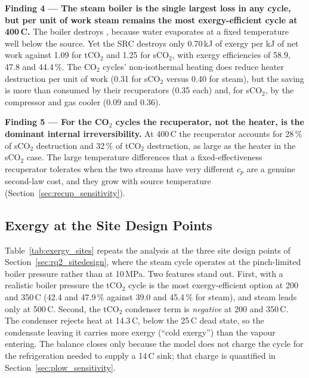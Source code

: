 \begin{findingbox}
\textbf{Finding 4 --- The steam boiler is the single largest loss in any
cycle, but per unit of work steam remains the most exergy-efficient cycle
at 400\,\textdegree C.}
The boiler destroys ,
because water evaporates at a fixed temperature well below the source. Yet
the SRC destroys only 0.70\,kJ of exergy per kJ of net work against 1.09 for
tCO$_2$ and 1.25 for sCO$_2$, with exergy efficiencies of 58.9, 47.8 and
44.4\,\%. The CO$_2$ cycles' non-isothermal heating does reduce heater
destruction per unit of work (0.31 for sCO$_2$ versus 0.40 for steam), but
the saving is more than consumed by their recuperators (0.35 each) and, for
sCO$_2$, by the compressor and gas cooler (0.09 and 0.36).
\end{findingbox}

\begin{findingbox}
\textbf{Finding 5 --- For the CO$_2$ cycles the recuperator, not the heater,
is the dominant internal irreversibility.}
At 400\,\textdegree C the recuperator accounts for 28\,\% of sCO$_2$
destruction and 32\,\% of tCO$_2$ destruction, as large as the heater in the
sCO$_2$ case. The large temperature differences that a fixed-effectiveness
recuperator tolerates when the two streams have very different $c_p$ are a
genuine second-law cost, and they grow with source temperature
(Section~\ref{sec:recup_sensitivity}).
\end{findingbox}

\subsection{Exergy at the Site Design Points}

Table~\ref{tab:exergy_sites} repeats the analysis at the three site design
points of Section~\ref{sec:rq2_sitedesign}, where the steam cycle operates at
the pinch-limited boiler pressure rather than at 10\,MPa. Two features stand
out. First, with a realistic boiler pressure the tCO$_2$ cycle is the most
exergy-efficient option at 200 and 350\,\textdegree C (42.4 and 47.9\,\%
against 39.0 and 45.4\,\% for steam), and steam leads only at 500\,\textdegree C.
Second, the tCO$_2$ condenser term is \emph{negative} at 200 and
350\,\textdegree C. The condenser rejects heat at 14.3\,\textdegree C, below
the 25\,\textdegree C dead state, so the condensate leaving it carries more
exergy (``cold exergy'') than the vapour entering. The balance closes only
because the model does not charge the cycle for the refrigeration needed to
supply a 14\,\textdegree C sink; that charge is quantified in
Section~\ref{sec:plow_sensitivity}.

